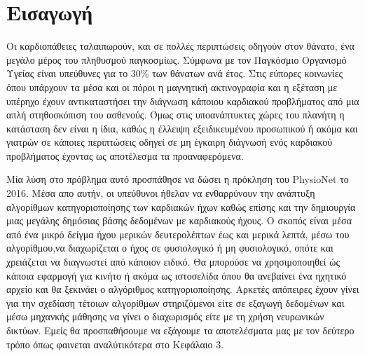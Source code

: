 \section{Εισαγωγή}
Οι καρδιοπάθειες ταλαιπωρούν, και σε πολλές περιπτώσεις οδηγούν στον θάνατο, ένα
μεγάλο μέρος του πληθυσμού παγκοσμίως. Σύμφωνα με τον Παγκόσμιο Οργανισμό Υγείας είναι
υπεύθυνες για το 30\% των θάνατων ανά έτος. Στις εύπορες κοινωνίες όπου υπάρχουν τα μέσα
και οι πόροι η μαγνητική ακτινογραφία και η εξέταση με υπέρηχο έχουν αντικαταστήσει την
διάγνωση κάποιου καρδιακού προβλήματος από μια απλή στηθοσκόπιση του ασθενούς. Όμως στις
υποανάπτυκτες χώρες του πλανήτη η κατάσταση δεν είναι η ίδια, καθώς η έλλειψη εξειδικευμένου
προσωπικού ή ακόμα και γιατρών σε κάποιες περιπτώσεις οδηγεί σε μη έγκαιρη διάγνωσή ενός καρδιακού
προβλήματος έχοντας ως αποτέλεσμα τα προαναφερόμενα.

Μία λύση στο πρόβλημα αυτό προσπάθησε να δώσει η πρόκληση του PhysioNet το
2016. Μέσα απο αυτήν, οι υπεύθυνοι ήθελαν να ενθαρρύνουν την ανάπτυξη αλγορίθμων
κατηγοριοποίησης των καρδιακών ήχων καθώς επίσης και την δημιουργία μιας μεγάλης
δημόσιας βάσης δεδομένων με καρδιακούς ήχους. Ο σκοπός είναι μέσα από ένα μικρό δείγμα
ήχου μερικών δευτερολέπτων έως και μερικά λεπτά, μέσω του αλγορίθμου,να διαχωρίζεται
ο ήχος σε φυσιολογικό ή μη φυσιολογικό, οπότε και χρειάζεται να διαγνωστεί από κάποιον
ειδικό. Θα μπορούσε να χρησιμοποιηθεί ώς κάποια εφαρμογή για κινήτο ή ακόμα ως ιστοσελίδα
όπου θα ανεβαίνει ένα ηχητικό αρχείο και θα ξεκινάει ο αλγόριθμος κατηγοριοποίησης. Αρκετές
απόπειρες έχουν γίνει για την σχεδίαση τέτοιων αλγορίθμων στηριζόμενοι είτε σε εξαγωγή δεδομένων
και μέσω μηχανκής μάθησης να γίνει ο διαχωρισμός είτε με τη χρήση νευρωνικών δικτύων. Εμείς
θα προσπαθήσουμε να εξάγουμε τα αποτελέσματα μας με τον δεύτερο τρόπο όπως φαινεται αναλύτικότερα 
στο Κεφάλαιο 3.
